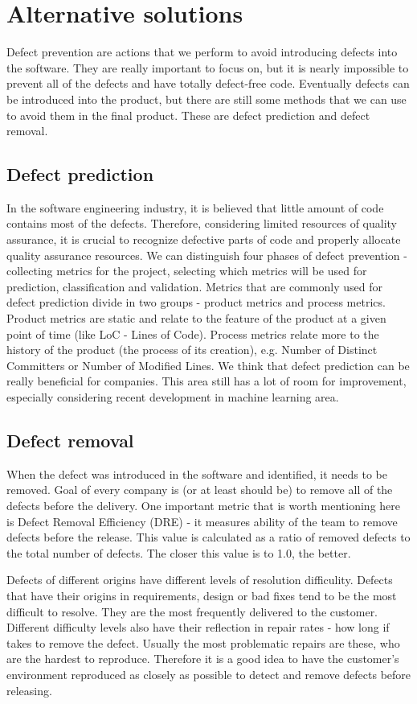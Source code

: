 \section{Alternative solutions}
Defect prevention are actions that we perform to avoid introducing defects into the software. They are really important to focus on, but it is nearly impossible to prevent all of the defects and have totally defect-free code. Eventually defects can be introduced into the product, but there are still some methods that we can use to avoid them in the final product. These are defect prediction and defect removal.

\subsection{Defect prediction}
In the software engineering industry, it is believed that little amount of code contains most of the defects\cite{pred1}. Therefore, considering limited resources of quality assurance, it is crucial to recognize defective parts of code and properly allocate quality assurance resources. We can distinguish four phases of defect prevention - collecting metrics for the project, selecting which metrics will be used for prediction, classification and validation. Metrics that are commonly used for defect prediction divide in two groups - product metrics and process metrics. Product metrics are static and relate to the feature of the product at a given point of time (like LoC - Lines of Code). Process metrics relate more to the history of the product (the process of its creation), e.g. Number of Distinct Committers or Number of Modified Lines. We think that defect prediction can be really beneficial for companies. This area still has a lot of room for improvement, especially considering recent development in machine learning area. 

\subsection{Defect removal}
When the defect was introduced in the software and identified, it needs to be removed. Goal of every company is (or at least should be) to remove all of the defects before the delivery. One important metric that is worth mentioning here is Defect Removal Efficiency (DRE) - it measures ability of the team to remove defects before the release. This value is calculated as a ratio of removed defects to the total number of defects. The closer this value is to 1.0, the better. 

Defects of different origins have different levels of resolution difficulity. Defects that have their origins in requirements, design or bad fixes tend to be the most difficult to resolve\cite{capers}. They are the most frequently delivered to the customer. Different difficulty levels also have their reflection in repair rates - how long if takes to remove the defect. Usually the most problematic repairs are these, who are the hardest to reproduce\cite{capers}. Therefore it is a good idea to have the customer's environment reproduced as closely as possible to detect and remove defects before releasing.
